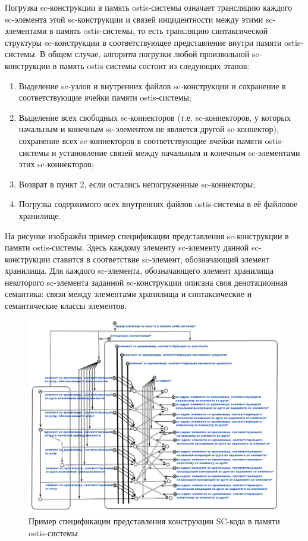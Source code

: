 Погрузка sc-конструкции в память ostis-системы означает трансляцию каждого sc-элемента этой sc-конструкции и связей инцидентности между этими sc-элементами в память ostis-системы, то есть трансляцию синтаксической структуры sc-конструкции в соответствующее представление внутри памяти ostis-системы. В общем случае, алгоритм погрузки любой произвольной sc-конструкции в память ostis-системы состоит из следующих этапов:
\begin{enumerate}
    \item Выделение sc-узлов и внутренних файлов sc-конструкции и сохранение в соответствующие ячейки памяти ostis-системы;
    \item Выделение всех свободных sc-коннекторов (т.е. sc-коннекторов, у которых начальным и конечным sc-элементом не является другой sc-коннектор), сохранение всех sc-коннекторов в соответствующие ячейки памяти ostis-системы и установление связей между начальным и конечным sc-элементами этих sc-коннекторов;
    \item Возврат в пункт 2, если остались непогруженные sc-коннекторы;
    \item Погрузка содержимого всех внутренних файлов ostis-системы в её файловое хранилище.
\end{enumerate}

На рисунке  изображён пример спецификации представления sc-конструкции в памяти ostis-системы. Здесь каждому элементу sc-элементу данной sc-конструкции ставится в соответствие sc-элемент, обозначающий элемент хранилища. Для каждого sc-элемента, обозначающего элемент хранилища некоторого sc-элемента заданной sc-конструкции описана своя денотационная семантика: связи между элементами хранилища и  синтаксические и семантические классы элементов.

\begin{figure}[htbp]
  \center
  \includegraphics[scale=0.55]{author/part6/figures/sc_code_in_memory_representation.png}
  \caption{Пример спецификации представления конструкции SC-кода в памяти ostis-системы}
  \label{fig:sc_code_in_memory_representation}
\end{figure}

